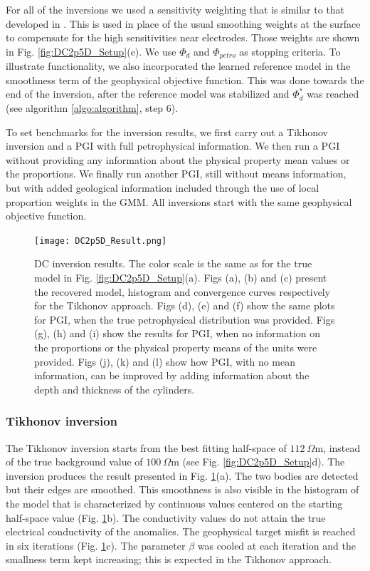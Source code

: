 \documentclass[extra]{gji} %
\begin{document}
For all of the inversions we used a sensitivity weighting that is similar to that developed in \cite{doi:10.1190/1.1820468}. This is used in place of the usual smoothing weights at the surface to compensate for the high sensitivities near electrodes. Those weights are shown in Fig. \ref{fig:DC2p5D_Setup}(e). We use $\Phi_d$ and $\Phi_{petro}$ as stopping criteria. To illustrate functionality, we also incorporated the learned reference model in the smoothness term of the geophysical objective function. This was done towards the end of the inversion, after the reference model was stabilized and $\Phi_d^*$ was reached (see algorithm \ref{algo:algorithm}, step 6).

To set benchmarks for the inversion results, we first carry out a Tikhonov inversion and a PGI with full petrophysical information. We then run a PGI without providing any information about the physical property mean values or the proportions. We finally run another PGI, still without means information, but with added geological information included through the use of local proportion weights in the GMM. All inversions start with the same geophysical objective function.

\begin{figure}
\centering
\texttt{[image: DC2p5D\_Result.png]}
\caption{DC inversion results. The color scale is the same as for the true model in Fig. \ref{fig:DC2p5D_Setup}(a). Figs (a), (b) and (c) present the recovered model, histogram and convergence curves respectively for the Tikhonov approach. Figs (d), (e) and (f) show the same plots for PGI, when the true petrophysical distribution was provided. Figs (g), (h) and (i) show the results for PGI, when no information on the proportions or the physical property means of the units were provided. Figs (j), (k) and (l) show how PGI, with no mean information, can be improved by adding information about the  depth and thickness of the cylinders.}
\label{fig:DC2p5D_Result}
\end{figure}

\subsubsection{Tikhonov inversion}

The Tikhonov inversion starts from the best fitting half-space of $112~\Omega \text{m}$, instead of the true background value of $100~\Omega \text{m}$ (see Fig. \ref{fig:DC2p5D_Setup}d). The inversion produces the result presented in Fig. \ref{fig:DC2p5D_Result}(a). The two bodies are detected but their edges are smoothed. This smoothness is also visible in the histogram of the model that is characterized by continuous values centered on the starting half-space value (Fig. \ref{fig:DC2p5D_Result}b). The conductivity values do not attain the true electrical conductivity of the anomalies. The geophysical target misfit is reached in six iterations (Fig. \ref{fig:DC2p5D_Result}c). The parameter $\beta$ was cooled at each iteration and the smallness term kept increasing; this is expected in the Tikhonov approach.
\end{document}
